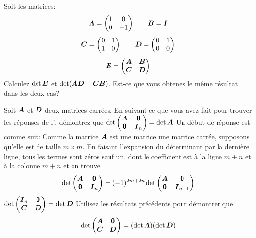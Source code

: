 \begin{TwoCol}
\begin{exercice}
Soit les matrices:
\[
\boldsymbol{A} = \begin{pmatrix}
1 & 0 \\ 0 & -1
\end{pmatrix} \qquad
\boldsymbol{B} = \boldsymbol{I}
\]
\[
\boldsymbol{C} = \begin{pmatrix}
0 & 1\\ 1 & 0
\end{pmatrix} \qquad
\boldsymbol{D} = \begin{pmatrix}
0 & 1\\ 0 & 0
\end{pmatrix}
\]
\[
\boldsymbol{E} = \begin{pmatrix}
\boldsymbol{A} & \boldsymbol{B} \\ \boldsymbol{C} & \boldsymbol{D}
\end{pmatrix}
\]
Calculez $\det \boldsymbol{E} $ et $\det (\boldsymbol{A}\boldsymbol{D} - \boldsymbol{C}\boldsymbol{B})$.  Est-ce que vous
obtenez le même résultat dans les deux cas?
\end{exercice}
\begin{exercice}
Soit $\boldsymbol{A}$ et $\boldsymbol{D}$ deux matrices carrées.  En suivant ce que vous avez
fait pour trouver les réponses de l', démontrez que
 $\displaystyle
\det \begin{pmatrix}
\boldsymbol{A} & \mbox{\textsf{\textbf{{0}}}} \\
\mbox{\textsf{\textbf{{0}}}} & \boldsymbol{I}_n
\end{pmatrix} = \det \boldsymbol{A}$
\reponse
Un début de réponse est comme suit:  Comme la matrice $\boldsymbol{A}$ est
une matrice une matrice carrée, supposons qu'elle est de taille $m\times m$. 
En faisant l'expansion du déterminant
par la dernière ligne, tous les termes sont zéros sauf un, dont le coefficient
est à la ligne $m+n$ et à la colonne $m+n$ et on trouve
\[
\det \begin{pmatrix}
\boldsymbol{A} & \mbox{\textsf{\textbf{{0}}}} \\
\mbox{\textsf{\textbf{{0}}}} & \boldsymbol{I}_n
\end{pmatrix} = (-1)^{2m+2n} \det \begin{pmatrix}
\boldsymbol{A} & \mbox{\textsf{\textbf{{0}}}} \\
\mbox{\textsf{\textbf{{0}}}} & \boldsymbol{I}_{n-1}
\end{pmatrix}
\]
  $\displaystyle
\det \begin{pmatrix}
\boldsymbol{I}_n & \mbox{\textsf{\textbf{{0}}}} \\
\boldsymbol{C} & \boldsymbol{D}
\end{pmatrix} = \det \boldsymbol{D}$
 Utilisez les résultats précédents pour démontrer que
\[
\det \begin{pmatrix}
\boldsymbol{A} & \mbox{\textsf{\textbf{{0}}}} \\
\boldsymbol{C} & \boldsymbol{D}
\end{pmatrix} = (\det \boldsymbol{A})(\det\boldsymbol{D})
\]
\end{exercice}
\end{TwoCol}
